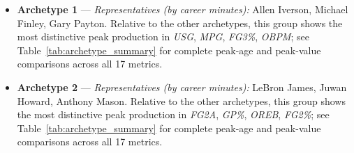 \begin{itemize}
\item \textbf{Archetype 1} --- \emph{Representatives (by career minutes):} Allen Iverson, Michael Finley, Gary Payton. Relative to the other archetypes, this group shows the most distinctive peak production in \textit{USG}, \textit{MPG}, \textit{FG3\%}, \textit{OBPM}; see Table~\ref{tab:archetype_summary} for complete peak-age and peak-value comparisons across all 17 metrics.
\item \textbf{Archetype 2} --- \emph{Representatives (by career minutes):} LeBron James, Juwan Howard, Anthony Mason. Relative to the other archetypes, this group shows the most distinctive peak production in \textit{FG2A}, \textit{GP\%}, \textit{OREB}, \textit{FG2\%}; see Table~\ref{tab:archetype_summary} for complete peak-age and peak-value comparisons across all 17 metrics.
\end{itemize}
